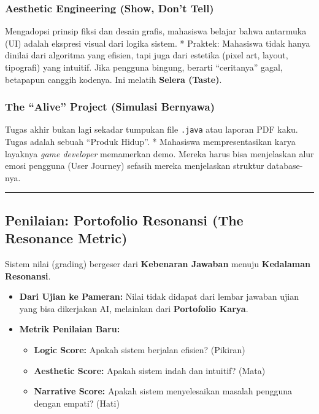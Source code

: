 \documentclass[
  letterpaper,
  DIV=11,
  numbers=noendperiod]{scrreprt}
\providecommand{\tightlist}{%
  \setlength{\itemsep}{0pt}\setlength{\parskip}{0pt}}
\begin{document}
\subsubsection{Aesthetic Engineering (Show, Don't
Tell)}\label{aesthetic-engineering-show-dont-tell}

Mengadopsi prinsip fiksi dan desain grafis, mahasiswa belajar bahwa
antarmuka (UI) adalah ekspresi visual dari logika sistem. * Praktek:
Mahasiswa tidak hanya dinilai dari algoritma yang efisien, tapi juga
dari estetika (pixel art, layout, tipografi) yang intuitif. Jika
pengguna bingung, berarti ``ceritanya'' gagal, betapapun canggih
kodenya. Ini melatih \textbf{Selera (Taste)}.

\subsubsection{The ``Alive'' Project (Simulasi
Bernyawa)}\label{the-alive-project-simulasi-bernyawa}

Tugas akhir bukan lagi sekadar tumpukan file \texttt{.java} atau laporan
PDF kaku. Tugas adalah sebuah ``Produk Hidup''. * Mahasiswa
mempresentasikan karya layaknya \emph{game developer} memamerkan demo.
Mereka harus bisa menjelaskan alur emosi pengguna (User Journey) sefasih
mereka menjelaskan struktur database-nya.

\begin{center}\rule{0.5\linewidth}{0.5pt}\end{center}

\subsection{Penilaian: Portofolio Resonansi (The Resonance
Metric)}\label{penilaian-portofolio-resonansi-the-resonance-metric}

Sistem nilai (grading) bergeser dari \textbf{Kebenaran Jawaban} menuju
\textbf{Kedalaman Resonansi}.

\begin{itemize}
\tightlist
\item
  \textbf{Dari Ujian ke Pameran:} Nilai tidak didapat dari lembar
  jawaban ujian yang bisa dikerjakan AI, melainkan dari
  \textbf{Portofolio Karya}.
\item
  \textbf{Metrik Penilaian Baru:}

  \begin{itemize}
  \tightlist
  \item
    \textbf{Logic Score:} Apakah sistem berjalan efisien? (Pikiran)
  \item
    \textbf{Aesthetic Score:} Apakah sistem indah dan intuitif? (Mata)
  \item
    \textbf{Narrative Score:} Apakah sistem menyelesaikan masalah
    pengguna dengan empati? (Hati)
  \end{itemize}
\end{itemize}
\end{document}
